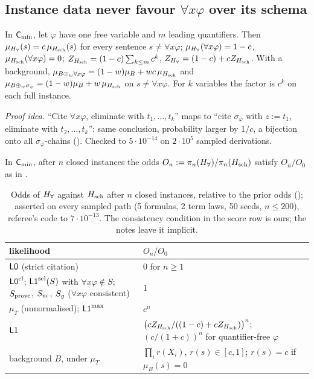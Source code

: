 \subsection{Instance data never favour \texorpdfstring{$\forall x\varphi$}{forall x phi} over its schema}\label{sec:univ:never}

\begin{proposition}[Factorisation]\label{prop:univ:factor}
In $\mathsf{C}_{\min}$, let $\varphi$ have one free variable and $m$ leading quantifiers. Then $\mu_{H_{\forall}}(s)=c\,\mu_{H_{\mathrm{sch}}}(s)$ for every sentence $s\neq\forall x\varphi$; $\mu_{H_{\forall}}(\forall x\varphi)=1-c$, $\mu_{H_{\mathrm{sch}}}(\forall x\varphi)=0$; $Z_{H_{\mathrm{sch}}}=(1-c)\sum_{k\le m}c^k$, $Z_{H_{\forall}}=(1-c)+cZ_{H_{\mathrm{sch}}}$. With a background, $\mu_{B\oplus_w\forall x\varphi}=(1-w)\mu_B+wc\,\mu_{H_{\mathrm{sch}}}$ and $\mu_{B\oplus_w\sigma_\varphi}=(1-w)\mu_B+w\,\mu_{H_{\mathrm{sch}}}$ on $s\neq\forall x\varphi$. For $k$ variables the factor is $c^k$ on each full instance.
\end{proposition}

\noindent\emph{Proof idea.} ``Cite $\forall x\varphi$, eliminate with $t_1,\dots,t_k$'' maps to ``cite $\sigma_\varphi$ with $z:=t_1$, eliminate with $t_2,\dots,t_k$'': same conclusion, probability larger by $1/c$, a bijection onto all $\sigma_\varphi$-chains (). Checked to $5\cdot10^{-14}$ on $2\cdot10^5$ sampled derivations.

\begin{theorem}\label{thm:univ:odds}
In $\mathsf{C}_{\min}$, after $n$ closed instances the odds $O_n:=\pi_n(H_{\forall})/\pi_n(H_{\mathrm{sch}})$ satisfy $O_n/O_0$ as in .
\end{theorem}

\begin{table}[t]
\centering\small
\begin{tabularx}{\textwidth}{@{}>{\raggedright\arraybackslash}p{}X@{}}
\toprule
likelihood & $O_n/O_0$\\
\midrule
$\mathord{\mathsf{L0}}$ (strict citation) & $0$ for $n\ge1$\\
$\mathord{\mathsf{L0}}^{\mathrm{cl}}$; $\mathord{\mathsf{L1}}^{\mathrm{sel}}(S)$ with $\forall x\varphi\notin S$; $S_{\mathrm{prove}}$, $S_{\mathrm{nc}}$, $S_{g}$ ($\forall x\varphi$ consistent) & $1$\\
$\mu_T$ (unnormalised); $\mathord{\mathsf{L1}}^{\max}$ & $c^n$\\
$\mathord{\mathsf{L1}}$ & $\big(cZ_{H_{\mathrm{sch}}}/((1-c)+cZ_{H_{\mathrm{sch}}})\big)^n$; $(c/(1+c))^n$ for quantifier-free $\varphi$\\
background $B$, under $\mu_T$ & $\prod_ir(X_i)$, $r(s)\in[c,1]$; $r(s)=c$ if $\mu_B(s)=0$\\
\bottomrule
\end{tabularx}
\caption{Odds of $H_{\forall}$ against $H_{\mathrm{sch}}$ after $n$ closed instances, relative to the prior odds (); asserted on every sampled path (5 formulas, 2 term laws, 50 seeds, $n\le200$), referee's code to $7\cdot10^{-13}$. The consistency condition in the score row is ours; the notes leave it implicit.}
\label{tab:univ:odds}
\end{table}

